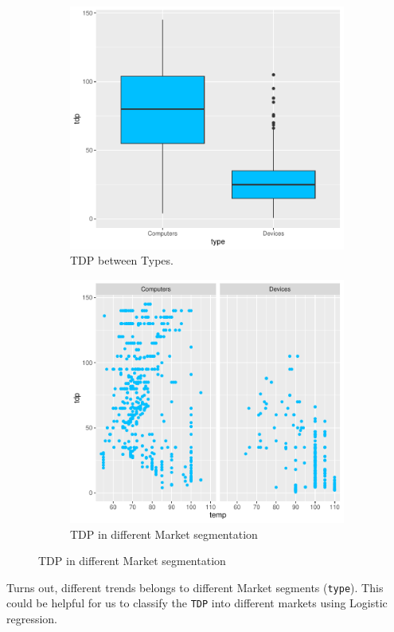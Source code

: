 \begin{itemize}
        \begin{figure}[H]
            \centering
            \begin{subfigure}[]{0.4\textwidth}
                \includegraphics[width=\textwidth]{./graphics/box_tdp_type.pdf}
                \caption{TDP between Types.}
            \end{subfigure}
            \begin{subfigure}[]{0.4\textwidth}
                \includegraphics[width=\textwidth]{./graphics/scatter_type_tdp_temp.pdf}
                \caption{TDP in different Market segmentation}
            \end{subfigure}
        \end{figure}

    Turns out, different trends belongs to different Market segments (\verb|type|). This could be helpful for us to classify the \verb|TDP| into different markets
    using Logistic regression.
\end{itemize}